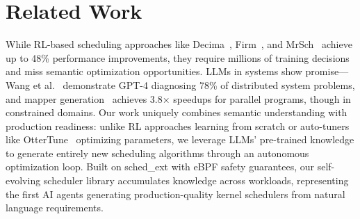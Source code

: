 \section{Related Work}

While RL-based scheduling approaches like Decima~\cite{mao2019decima}, Firm~\cite{qiu2020firm}, and MrSch~\cite{zhang2024mrsch} achieve up to 48\% performance improvements, they require millions of training decisions and miss semantic optimization opportunities. LLMs in systems show promise—Wang et al.~\cite{wang2024llmsys} demonstrate GPT-4 diagnosing 78\% of distributed system problems, and mapper generation~\cite{wei2024mapper} achieves 3.8× speedups for parallel programs, though in constrained domains. Our work uniquely combines semantic understanding with production readiness: unlike RL approaches learning from scratch or auto-tuners like OtterTune~\cite{vanaken2017ottertune} optimizing parameters, we leverage LLMs' pre-trained knowledge to generate entirely new scheduling algorithms through an autonomous optimization loop. Built on sched\_ext with eBPF safety guarantees, our self-evolving scheduler library accumulates knowledge across workloads, representing the first AI agents generating production-quality kernel schedulers from natural language requirements.